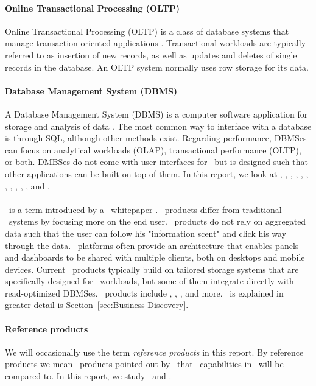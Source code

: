 \paragraph{Online Transactional Processing (OLTP)}
\label{par:Online Transactional Processing (OLTP)}
Online Transactional Processing (OLTP) is a class of database systems that manage transaction-oriented applications \cite{Wikipedia_contributors2015-cw}. Transactional workloads are typically referred to as insertion of new records, as well as updates and deletes of single records in the database. An OLTP system normally uses row storage for its data.

\paragraph{Database Management System (DBMS)}
\label{par:Database Management System (DBMS)}
A Database Management System (DBMS) is a computer software application for storage and analysis of data \cite{Wikipedia_contributors2015-pb}. The most common way to interface with a database is through SQL, although other methods exist. Regarding performance, DBMSes can focus on analytical workloads (OLAP), transactional performance (OLTP), or both. DMBSes do not come with user interfaces for \bd~but is designed such that other applications can be built on top of them. In this report, we look at \oracle, \ibm, \saph, \sapnw, \mssql, \cstore, \vertica, \blink, \exasol, \oracle, \hyper, and \hyrise.

\paragraph{\bd}
\label{par:Business Discovery}
\bd~is a term introduced by a \qlikview~whitepaper \cite{Qlik2014-vd}. \bd~products differ from traditional \bi~systems by focusing more on the end user. \bd~products do not rely on aggregated data such that the user can follow his "information scent" and click his way through the data. \bd~platforms often provide an architecture that enables panels and dashboards to be shared with multiple clients, both on desktops and mobile devices. Current \bd~products typically build on tailored storage systems that are specifically designed for \bd~workloads, but some of them integrate directly with read-optimized DBMSes. \bd~products include \tableau, \qlikview, \powerpivot, and more. \bd~is explained in greater detail is Section~\ref{sec:Business Discovery}.

\paragraph{Reference products}
\label{par:Reference products}
We will occasionally use the term \textit{reference products} in this report. By reference products we mean \bd~products pointed out by \genus~that \bd~capabilities in \genusSoftware~will be compared to. In this report, we study \qlikview~and \tableau.

